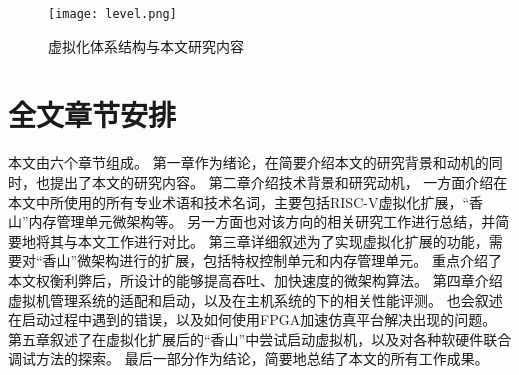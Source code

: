 \begin{figure}[htbp]
    \centering
\texttt{[image: level.png]}
\caption{虚拟化体系结构与本文研究内容}
    \label{fig:level}
\end{figure}

\section{全文章节安排}
本文由六个章节组成。
第一章作为绪论，在简要介绍本文的研究背景和动机的同时，也提出了本文的研究内容。
第二章介绍技术背景和研究动机，
一方面介绍在本文中所使用的所有专业术语和技术名词，主要包括RISC-V虚拟化扩展，“香山”内存管理单元微架构等。
另一方面也对该方向的相关研究工作进行总结，并简要地将其与本文工作进行对比。
第三章详细叙述为了实现虚拟化扩展的功能，需要对“香山”微架构进行的扩展，包括特权控制单元和内存管理单元。
重点介绍了本文权衡利弊后，所设计的能够提高吞吐、加快速度的微架构算法。
第四章介绍虚拟机管理系统的适配和启动，以及在主机系统的下的相关性能评测。
也会叙述在启动过程中遇到的错误，以及如何使用FPGA加速仿真平台解决出现的问题。
第五章叙述了在虚拟化扩展后的“香山”中尝试启动虚拟机，以及对各种软硬件联合调试方法的探索。
最后一部分作为结论，简要地总结了本文的所有工作成果。